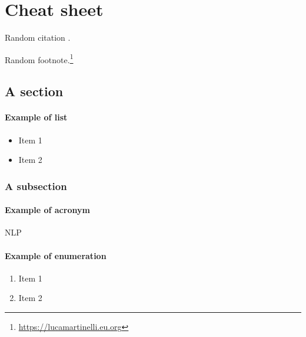 
\chapter{Cheat sheet}
\label{chp:cheat}




Random citation \cite{alecci2021development}.




Random footnote.\footnote{\url{https://lucamartinelli.eu.org}}




\section{A section}




\subsubsection{Example of list}
\begin{itemize}
  \item Item 1
  \item Item 2
\end{itemize}




\subsection{A subsection}




\subsubsection{Example of acronym}
\ac{NLP}




\subsubsection{Example of enumeration}
\begin{enumerate}
  \item Item 1
  \item Item 2
\end{enumerate}


